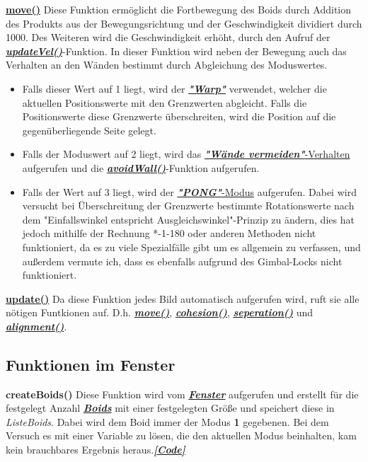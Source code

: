 \documentclass[a4paper, hidelinks, 12pt]{article}
\begin{document}
\normalsize\underline{\textbf{move()}}\label{sec:move}
Diese Funktion ermöglicht die Fortbewegung des Boids durch Addition des Produkts aus der Bewegungsrichtung und der Geschwindigkeit dividiert durch 1000. Des Weiteren wird die Geschwindigkeit erhöht, durch den Aufruf der \hyperref[sec:updateVel]{\textbf{\emph{updateVel()}}}-Funktion.
In dieser Funktion wird neben der Bewegung auch das Verhalten an den Wänden bestimmt durch Abgleichung des Moduswertes.\newline
\begin{itemize}
\item Falls dieser Wert auf 1 liegt, wird der \hyperref[sec:Warp]{\textbf{\emph{"Warp"}}} verwendet, welcher die aktuellen Positionswerte mit den Grenzwerten abgleicht. Falls die Positionswerte diese Grenzwerte überschreiten, wird die Position auf die gegenüberliegende Seite gelegt.
\item Falls der Moduswert auf 2 liegt, wird das \hyperref[sec:AvoidWall]{\textbf{\emph{"Wände vermeiden"}}-Verhalten} aufgerufen und die \hyperref[sec:avoidWall]{\textbf{\emph{avoidWall()}}}-Funktion aufgerufen.
\item Falls der Wert auf 3 liegt, wird der \hyperref[sec:Pong]{\textbf{\emph{"PONG"}}-Modus} aufgerufen. Dabei wird versucht bei Überschreitung der Grenzwerte bestimmte Rotationswerte nach dem "Einfallswinkel entspricht Ausgleichswinkel"-Prinzip zu ändern, dies hat jedoch mithilfe der Rechnung *-1-180 oder anderen Methoden\cite{Space2022} nicht funktioniert, da es zu viele Spezialfälle gibt um es allgemein zu verfassen, und außerdem vermute ich, dass es ebenfalls aufgrund des Gimbal-Locks\cite{2022o} nicht funktioniert.
\end{itemize}
		
\underline{\textbf{update()}}\label{sec:update}
Da diese Funktion jedes Bild automatisch aufgerufen wird\cite{update}, ruft sie alle nötigen Funtkionen auf. D.h. \hyperref[sec:move]{\textbf{\emph{move()}}}, \hyperref[sec:cohesion]{\textbf{\emph{cohesion()}}}, \hyperref[sec:seperation]{\textbf{\emph{seperation()}}} und \hyperref[sec:alignment]{\textbf{\emph{alignment()}}}.
			
\subsection{Funktionen im Fenster}
\textbf{createBoids()}\label{sec:createBoids}
Diese Funktion wird vom \hyperref[sec:Fenster]{\textbf{\emph{Fenster}}} aufgerufen und erstellt für die festgelegt Anzahl \hyperref[sec:Boid]{\textbf{\emph{Boids}}} mit einer festgelegten Größe und speichert diese in \emph{Liste\textunderscore Boids}. Dabei wird dem Boid immer der Modus \textbf{1} gegebenen. Bei dem Versuch es mit einer Variable zu lösen, die den aktuellen Modus beinhalten, kam kein brauchbares Ergebnis heraus.\hyperref[CodecreateBoids]{\textbf{\emph{[Code]}}}
			
\end{document}

